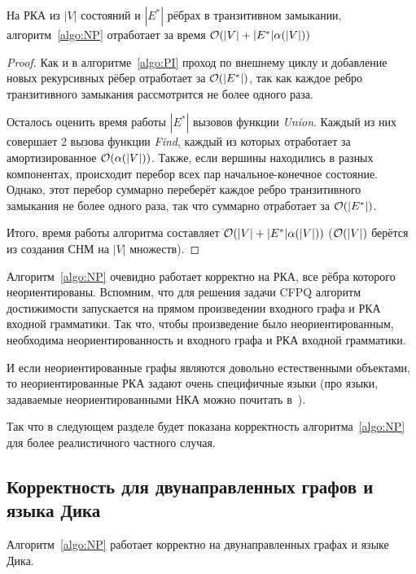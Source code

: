 \begin{theorem}
  На РКА из $|V|$ состояний и $|E^{*}|$ рёбрах в транзитивном замыкании, алгоритм~\ref{algo:NP} отработает за время $\mathcal{O}(|V| + |E^{*}| \alpha(|V|))$
\end{theorem}

\begin{proof}
  Как и в алгоритме~\ref{algo:PI} проход по внешнему циклу и добавление новых рекурсивных рёбер отработает за $\mathcal{O}(|E^{*}|)$, так как каждое ребро транзитивного замыкания рассмотрится не более одного раза.

  Осталось оценить время работы $|E^{*}|$ вызовов функции \textit{Union}. Каждый из них совершает 2 вызова функции \textit{Find}, каждый из которых отработает за амортизированное $\mathcal{O}(\alpha(|V|))$. Также, если вершины находились в разных компонентах, происходит перебор всех пар начальное-конечное состояние. Однако, этот перебор суммарно переберёт каждое ребро транзитивного замыкания не более одного раза, так что суммарно отработает за $\mathcal{O}(|E^{*}|)$.

  Итого, время работы алгоритма составляет $\mathcal{O}(|V| + |E^{*}| \alpha(|V|))$ ($\mathcal{O}(|V|)$ берётся из создания СНМ на $|V|$ множеств). 
\end{proof}

\begin{note}
  Алгоритм~\ref{algo:NP} очевидно работает корректно на РКА, все рёбра которого неориентированы. Вспомним, что для решения задачи CFPQ алгоритм достижимости запускается на прямом произведении входного графа и РКА входной грамматики. Так что, чтобы произведение было неориентированным, необходима неориентированность и входного графа и РКА входной грамматики. 

  И если неориентированные графы являются довольно естественными объектами, то неориентированные РКА задают очень специфичные языки (про языки, задаваемые неориентированными НКА можно почитать в~\cite{Kutrib18}). 

  Так что в следующем разделе будет показана корректность алгоритма~\ref{algo:NP} для более реалистичного частного случая.
\end{note}

\subsection{Корректность для двунаправленных графов и языка Дика}

\begin{theorem}\label{th:bidir_corr}
  Алгоритм~\ref{algo:NP} работает корректно на двунаправленных графах и языке Дика.
\end{theorem}

